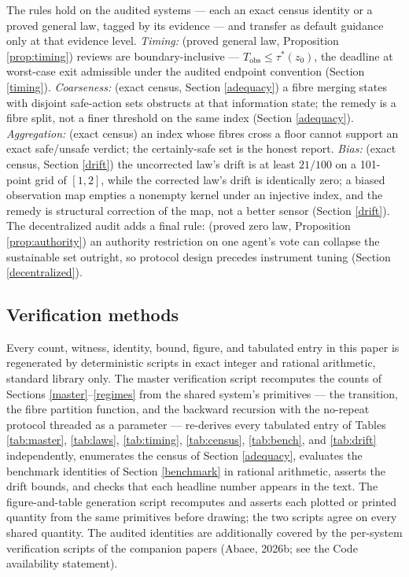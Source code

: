 \documentclass[10pt,twocolumn]{article}
\theoremstyle{definition}
\begin{document}
The rules hold on the audited systems --- each an exact census identity or a proved general law, tagged by its evidence --- and transfer as default guidance only at that evidence level. \emph{Timing:} (proved general law, Proposition \ref{prop:timing}) reviews are boundary-inclusive ---
\(T_{\mathrm{obs}} \le \tau^{*}(z_0)\), the deadline at worst-case exit admissible under the audited endpoint convention (Section \ref{timing}). \emph{Coarseness:} (exact census, Section \ref{adequacy}) a fibre
merging states with disjoint safe-action sets obstructs at that
information state; the remedy is a fibre split, not a finer threshold
on the same index (Section \ref{adequacy}). \emph{Aggregation:} (exact census) an index whose fibres cross a floor cannot support an exact
safe/unsafe verdict; the certainly-safe set is the honest report.
\emph{Bias:} (exact census, Section \ref{drift}) the uncorrected law's drift is at least \(21/100\) on a
101-point grid of \([1,2]\), while the corrected law's drift is
identically zero; a biased observation map empties a nonempty kernel
under an injective index, and the remedy is structural correction of
the map, not a better sensor (Section \ref{drift}). The decentralized audit adds a final rule: (proved zero law, Proposition \ref{prop:authority}) an authority restriction on one agent's vote can collapse the sustainable set outright, so protocol
design precedes instrument tuning (Section \ref{decentralized}).

\subsection{Verification methods}\label{methods}

Every count, witness, identity, bound, figure, and tabulated entry in
this paper is regenerated by deterministic scripts in exact integer and
rational arithmetic, standard library only. The master verification
script recomputes the counts of Sections \ref{master}--\ref{regimes}
from the shared system's primitives --- the transition, the fibre
partition function, and the backward recursion with the no-repeat
protocol threaded as a parameter --- re-derives every tabulated entry of
Tables \ref{tab:master}, \ref{tab:laws}, \ref{tab:timing},
\ref{tab:census}, \ref{tab:bench}, and \ref{tab:drift} independently,
enumerates the census of Section \ref{adequacy}, evaluates the
benchmark identities of Section \ref{benchmark} in rational
arithmetic, asserts the drift bounds, and checks that each headline
number appears in the text. The figure-and-table generation script
recomputes and asserts each plotted or printed quantity from the same
primitives before drawing; the two scripts agree on every shared
quantity. The audited identities are additionally covered by the
per-system verification scripts of the companion papers (Abaee, 2026b;
see the Code availability statement).
\end{document}
